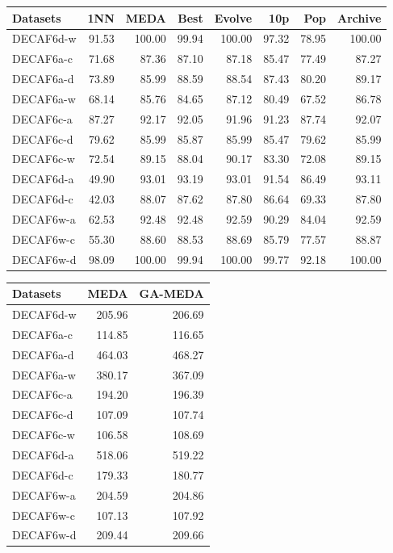 \documentclass[a4paper]{article}
\begin{document}
	\begin{tabular}{lrrrrrrr}
		\toprule
		Datasets &    1NN &    MEDA &   Best &  Evolve &    10p &    Pop &  Archive \\
		\midrule
		DECAF6d-w &  91.53 &  100.00 &  99.94 &  100.00 &  97.32 &  78.95 &   100.00 \\
		DECAF6a-c &  71.68 &   87.36 &  87.10 &   87.18 &  85.47 &  77.49 &    87.27 \\
		DECAF6a-d &  73.89 &   85.99 &  88.59 &   88.54 &  87.43 &  80.20 &    89.17 \\
		DECAF6a-w &  68.14 &   85.76 &  84.65 &   87.12 &  80.49 &  67.52 &    86.78 \\
		DECAF6c-a &  87.27 &   92.17 &  92.05 &   91.96 &  91.23 &  87.74 &    92.07 \\
		DECAF6c-d &  79.62 &   85.99 &  85.87 &   85.99 &  85.47 &  79.62 &    85.99 \\
		DECAF6c-w &  72.54 &   89.15 &  88.04 &   90.17 &  83.30 &  72.08 &    89.15 \\
		DECAF6d-a &  49.90 &   93.01 &  93.19 &   93.01 &  91.54 &  86.49 &    93.11 \\
		DECAF6d-c &  42.03 &   88.07 &  87.62 &   87.80 &  86.64 &  69.33 &    87.80 \\
		DECAF6w-a &  62.53 &   92.48 &  92.48 &   92.59 &  90.29 &  84.04 &    92.59 \\
		DECAF6w-c &  55.30 &   88.60 &  88.53 &   88.69 &  85.79 &  77.57 &    88.87 \\
		DECAF6w-d &  98.09 &  100.00 &  99.94 &  100.00 &  99.77 &  92.18 &   100.00 \\
		\bottomrule
	\end{tabular}
	
	\begin{tabular}{lrr}
		\toprule
		Datasets &    MEDA &  GA-MEDA \\
		\midrule
		DECAF6d-w &  205.96 &   206.69 \\
		DECAF6a-c &  114.85 &   116.65 \\
		DECAF6a-d &  464.03 &   468.27 \\
		DECAF6a-w &  380.17 &   367.09 \\
		DECAF6c-a &  194.20 &   196.39 \\
		DECAF6c-d &  107.09 &   107.74 \\
		DECAF6c-w &  106.58 &   108.69 \\
		DECAF6d-a &  518.06 &   519.22 \\
		DECAF6d-c &  179.33 &   180.77 \\
		DECAF6w-a &  204.59 &   204.86 \\
		DECAF6w-c &  107.13 &   107.92 \\
		DECAF6w-d &  209.44 &   209.66 \\
		\bottomrule
	\end{tabular}
	
\end{document}
